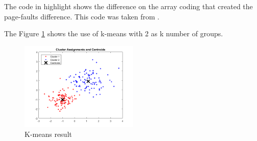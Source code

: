    The code in highlight shows the difference on the array coding that created the page-faults difference. This code was taken from \cite{essentials}.
    
    
The Figure \ref{fig:k-means} shows the use of k-means with 2 as k number of groups.

    \begin{figure}[h]
          \centering
            \includegraphics[width=0.50\textwidth]{figures/k-means.png}
            \caption{K-means result}
            \label{fig:k-means}
    \end{figure}
    
    
